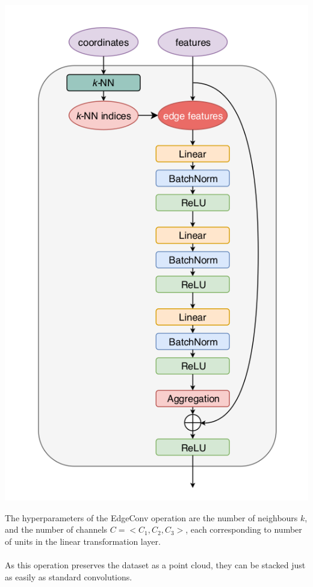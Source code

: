 \begin{center}
    \includegraphics[scale=0.3]{img/theory-ml-particlenet/edge-conv.png}
\end{center}

\noindent The hyperparameters of the EdgeConv operation are the number of neighbours $k$, and the number of channels $C = <C_1,C_2,C_3>$, each corresponding to  number of units in the linear transformation layer.

\paragraph{} As this operation preserves the dataset as a point cloud, they can be stacked just as easily as standard convolutions.

